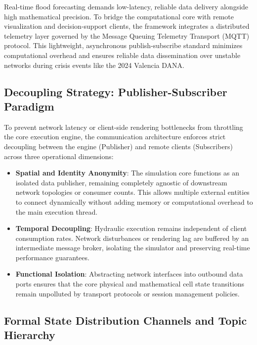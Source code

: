Real-time flood forecasting demands low-latency, reliable data delivery alongside high mathematical precision. To bridge the computational core with remote visualization and decision-support clients, the framework integrates a distributed telemetry layer governed by the Message Queuing Telemetry Transport (MQTT) protocol. This lightweight, asynchronous publish-subscribe standard minimizes computational overhead and ensures reliable data dissemination over unstable networks during crisis events like the 2024 Valencia DANA.

\subsection{Decoupling Strategy: Publisher-Subscriber Paradigm}
\label{subsec:decoupling_strategy}

To prevent network latency or client-side rendering bottlenecks from throttling the core execution engine, the communication architecture enforces strict decoupling between the engine (Publisher) and remote clients (Subscribers) across three operational dimensions:

\begin{itemize}
    \item \textbf{Spatial and Identity Anonymity}: The simulation core functions as an isolated data publisher, remaining completely agnostic of downstream network topologies or consumer counts. This allows multiple external entities to connect dynamically without adding memory or computational overhead to the main execution thread.
    
    \item \textbf{Temporal Decoupling}: Hydraulic execution remains independent of client consumption rates. Network disturbances or rendering lag are buffered by an intermediate message broker, isolating the simulator and preserving real-time performance guarantees.
    
    \item \textbf{Functional Isolation}: Abstracting network interfaces into outbound data ports ensures that the core physical and mathematical cell state transitions remain unpolluted by transport protocols or session management policies.
\end{itemize}

\subsection{Formal State Distribution Channels and Topic Hierarchy}
\label{subsec:topic_hierarchy}

